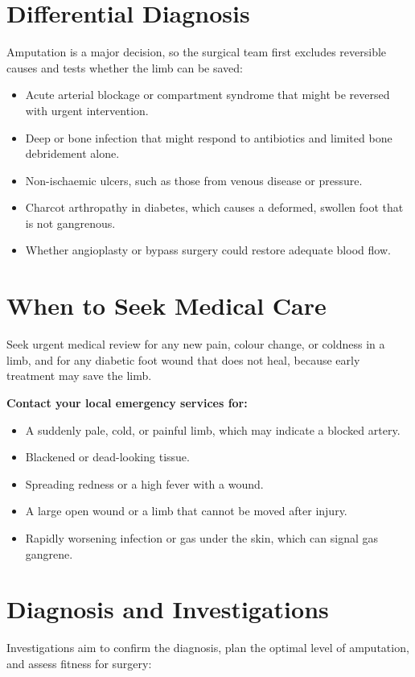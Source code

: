 \section*{Differential Diagnosis}
Amputation is a major decision, so the surgical team first excludes reversible causes and tests whether the limb can be saved:

\begin{itemize}
    \item Acute arterial blockage or compartment syndrome that might be reversed with urgent intervention.
    \item Deep or bone infection that might respond to antibiotics and limited bone debridement alone.
    \item Non-ischaemic ulcers, such as those from venous disease or pressure.
    \item Charcot arthropathy in diabetes, which causes a deformed, swollen foot that is not gangrenous.
    \item Whether angioplasty or bypass surgery could restore adequate blood flow.
\end{itemize}

\section*{When to Seek Medical Care}
Seek urgent medical review for any new pain, colour change, or coldness in a limb, and for any diabetic foot wound that does not heal, because early treatment may save the limb.

\textbf{Contact your local emergency services for:}
\begin{itemize}
    \item A suddenly pale, cold, or painful limb, which may indicate a blocked artery.
    \item Blackened or dead-looking tissue.
    \item Spreading redness or a high fever with a wound.
    \item A large open wound or a limb that cannot be moved after injury.
    \item Rapidly worsening infection or gas under the skin, which can signal gas gangrene.
\end{itemize}

\section*{Diagnosis and Investigations}
Investigations aim to confirm the diagnosis, plan the optimal level of amputation, and assess fitness for surgery:

